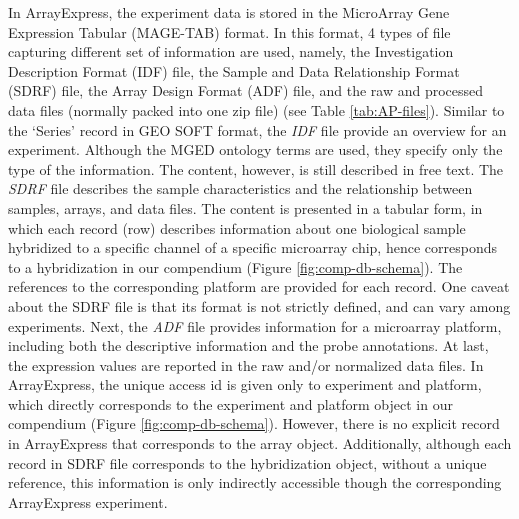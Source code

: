 In ArrayExpress, the experiment data is stored in the MicroArray Gene Expression Tabular (MAGE-TAB) format. In this format, 4 types of file capturing different set of information are used, namely, the Investigation Description Format (IDF) file, the Sample and Data Relationship Format (SDRF) file, the Array Design Format (ADF) file, and the raw and processed data files (normally packed into one zip file) (see Table \ref{tab:AP-files}). Similar to the `Series' record in GEO SOFT format, the \textit{IDF} file provide an overview for an experiment. Although the MGED ontology terms are used, they specify only the type of the information.  The content, however, is still described in free text. The \textit{SDRF} file describes the sample characteristics and the relationship between samples, arrays, and data files. The content is presented in a tabular form, in which each record (row) describes information about one biological sample hybridized to a specific channel of a specific microarray chip, hence corresponds to a hybridization in our compendium (Figure \ref{fig:comp-db-schema}). The references to the corresponding platform are provided for each record. One caveat about the SDRF file is that its format is not strictly defined, and can vary among experiments. Next, the \textit{ADF} file provides information for a microarray platform, including both the descriptive information and the probe annotations. At last, the expression values are reported in the raw and/or normalized data files. In ArrayExpress, the unique access id is given only to experiment and platform, which directly corresponds to the experiment and platform object in our compendium (Figure \ref{fig:comp-db-schema}). However, there is no explicit record in ArrayExpress that corresponds to the array object.  Additionally, although each record in SDRF file corresponds to the hybridization object, without a unique reference, this information is only indirectly accessible though the corresponding ArrayExpress experiment.


